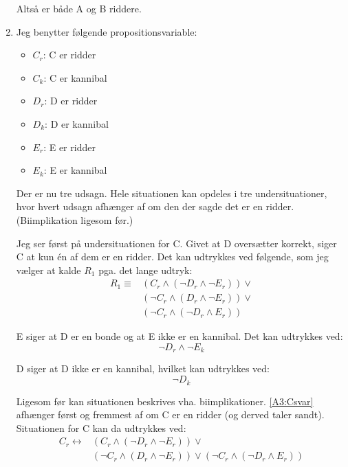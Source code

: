 \begin{enumerate}
  Altså er både A og B riddere.

  \item
  Jeg benytter følgende propositionsvariable:
  \begin{itemize}
    \item $C_r$: C er ridder
    \item $C_k$: C er kannibal
    \item $D_r$: D er ridder
    \item $D_k$: D er kannibal
    \item $E_r$: E er ridder
    \item $E_k$: E er kannibal
  \end{itemize}

  Der er nu tre udsagn. Hele situationen kan opdeles i tre undersituationer, hvor hvert udsagn afhænger af om den der sagde det er en ridder. (Biimplikation ligesom før.)

  Jeg ser først på undersituationen for C. Givet at D oversætter korrekt, siger C at kun én af dem er en ridder. Det kan udtrykkes ved følgende, som jeg vælger at kalde $R_1$ pga. det lange udtryk:
  \begin{equation}
    \label{A3:Csvar}
    \begin{split}
      R_1 \equiv & \left( C_r \land \left( \lnot D_r \land \lnot E_r \right) \right) \lor\\
                 & \left( \lnot C_r \land \left( D_r \land \lnot E_r \right) \right) \lor\\
                 & \left( \lnot C_r \land \left( \lnot D_r \land E_r \right) \right)
    \end{split}
  \end{equation}

  E siger at D er en bonde og at E ikke er en kannibal. Det kan udtrykkes ved:
  \begin{equation}
    \label{A3:Esvar}
    \lnot D_r \land \lnot E_k
  \end{equation}

  D siger at D ikke er en kannibal, hvilket kan udtrykkes ved:
  \begin{equation}
    \label{A3:Dsvar}
    \lnot D_k
  \end{equation}

  Ligesom før kan situationen beskrives vha. biimplikationer. \eqref{A3:Csvar} afhænger først og fremmest af om C er en ridder (og derved taler sandt). Situationen for C kan da udtrykkes ved:
  \begin{equation}
    \label{A3:Csituation}
    \begin{split}
      C_r \leftrightarrow & \left( C_r \land \left( \lnot D_r \land \lnot E_r \right) \right) \lor\\
      & \left( \lnot C_r \land \left( D_r \land \lnot E_r \right) \right) \lor \left( \lnot C_r \land \left( \lnot D_r \land E_r \right) \right)
    \end{split}
  \end{equation}


\end{enumerate}

